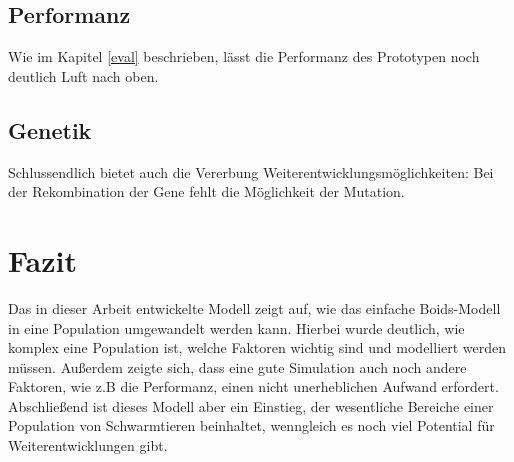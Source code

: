 \documentclass[draft=false
              ,paper=a4
              ,twoside=false
              ,fontsize=11pt
              ,headsepline
              ,BCOR10mm
              ,DIV11
              ,bibtotoc
              ,liststotoc
              ]{scrbook}
\begin{document}
\subsection{Performanz}
Wie im Kapitel \ref{eval} beschrieben, lässt die Performanz des Prototypen noch deutlich Luft nach oben.

\subsection{Genetik}
Schlussendlich bietet auch die Vererbung Weiterentwicklungsmöglichkeiten: Bei der Rekombination der Gene fehlt die Möglichkeit der Mutation.

\section{Fazit}
Das in dieser Arbeit entwickelte Modell zeigt auf, wie das einfache Boids-Modell in eine Population umgewandelt werden kann. Hierbei wurde deutlich, wie komplex eine Population ist, welche Faktoren wichtig sind und modelliert werden müssen. Außerdem zeigte sich, dass eine gute Simulation auch noch andere Faktoren, wie z.B die Performanz, einen nicht unerheblichen Aufwand erfordert.
Abschließend ist dieses Modell aber ein Einstieg, der wesentliche Bereiche einer Population von Schwarmtieren beinhaltet, wenngleich es noch viel Potential für Weiterentwicklungen gibt.



\backmatter

\nocite{*}



\renewcommand{\nomname}{Glossar}
\clearpage
\markboth{\nomname}{\nomname} %
\printnomenclature

\printindex

\HAWasurency
\end{document}
